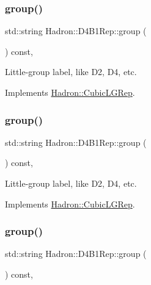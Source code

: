\subsubsection{\texorpdfstring{group()}{group()}\hspace{0.1cm}{\footnotesize\ttfamily [3/5]}}
{\footnotesize\ttfamily std\+::string Hadron\+::\+D4\+B1\+Rep\+::group (\begin{DoxyParamCaption}{ }\end{DoxyParamCaption}) const\hspace{0.3cm}{\ttfamily [inline]}, {\ttfamily [virtual]}}

Little-\/group label, like D2, D4, etc. 

Implements \mbox{\hyperlink{structHadron_1_1CubicLGRep_a9bdb14b519a611d21379ed96a3a9eb41}{Hadron\+::\+Cubic\+L\+G\+Rep}}.

\mbox{\label{structHadron_1_1D4B1Rep_a030bc1e51b0cc790000a6ce72d132d06}} 
\subsubsection{\texorpdfstring{group()}{group()}\hspace{0.1cm}{\footnotesize\ttfamily [4/5]}}
{\footnotesize\ttfamily std\+::string Hadron\+::\+D4\+B1\+Rep\+::group (\begin{DoxyParamCaption}{ }\end{DoxyParamCaption}) const\hspace{0.3cm}{\ttfamily [inline]}, {\ttfamily [virtual]}}

Little-\/group label, like D2, D4, etc. 

Implements \mbox{\hyperlink{structHadron_1_1CubicLGRep_a9bdb14b519a611d21379ed96a3a9eb41}{Hadron\+::\+Cubic\+L\+G\+Rep}}.

\mbox{\label{structHadron_1_1D4B1Rep_a030bc1e51b0cc790000a6ce72d132d06}} 
\subsubsection{\texorpdfstring{group()}{group()}\hspace{0.1cm}{\footnotesize\ttfamily [5/5]}}
{\footnotesize\ttfamily std\+::string Hadron\+::\+D4\+B1\+Rep\+::group (\begin{DoxyParamCaption}{ }\end{DoxyParamCaption}) const\hspace{0.3cm}{\ttfamily [inline]}, {\ttfamily [virtual]}}

